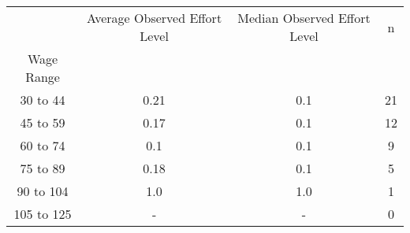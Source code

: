 \begin{tabular}{cccc}
\toprule
{} & Average Observed Effort Level & Median Observed Effort Level &   n \\
Wage Range &                               &                              &     \\
\midrule
30 to 44   &                          0.21 &                          0.1 &  21 \\
45 to 59   &                          0.17 &                          0.1 &  12 \\
60 to 74   &                           0.1 &                          0.1 &   9 \\
75 to 89   &                          0.18 &                          0.1 &   5 \\
90 to 104  &                           1.0 &                          1.0 &   1 \\
105 to 125 &                             - &                            - &   0 \\
\bottomrule
\end{tabular}
